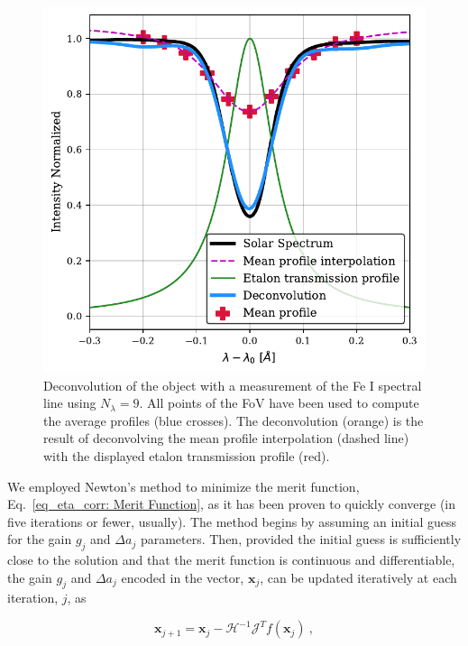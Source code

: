 \begin{figure}
\centering
\includegraphics[width=\textwidth]{figures/EtalonPaper/Deconvolution.pdf}
\caption{Deconvolution of the object with a measurement of the Fe I spectral line using $N_\lambda = 9$. All points of the FoV have been used to compute the average profiles (blue crosses). The deconvolution (orange) is the result of deconvolving the mean profile interpolation (dashed line) with the displayed etalon transmission profile (red).\label{fig_etalon_corr:Deconvolution} }
\end{figure}

We employed Newton's method to minimize the merit function, Eq.~\eqref{eq_eta_corr: Merit Function}, as it has been proven to quickly converge (in five iterations or fewer, usually). The method begins by assuming an initial guess for the gain $g_j$ and $\Delta a_j$ parameters. Then, provided the initial guess is sufficiently close to the solution and that the merit function is continuous and differentiable, the gain $g_j$ and $\Delta a_j$ encoded in the vector, $\mathbf{x}_j$, can be updated iteratively at each iteration, $j$, as

\begin{equation}
\mathbf{x} _ {j + 1} = \mathbf{x} _ j - \mathcal{H} ^ {- 1} \mathcal{J} ^ T f(\mathbf{x}_j) \ , 
\end{equation}

